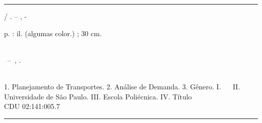 \documentclass[
  12pt,        %
  openright,      %
  twoside,      %
  a4paper,      %
  english,      %
  brazil        %
]{abntex2}
\begin{document}
\begin{fichacatalografica}
  \vspace*{\fill}          %
  \hrule              %
  \begin{center}          %
  \begin{minipage}[c]{12.5cm}    %

  \imprimirautor

  \hspace{0.5cm} \imprimirtitulo  / \imprimirautor. --
  \imprimirlocal, \imprimirdata-

  \hspace{0.5cm} \pageref{LastPage} p. : il. (algumas color.) ; 30 cm.\\

  \hspace{0.5cm} \imprimirorientadorRotulo~\imprimirorientador\\


  \hspace{0.5cm}
  \parbox[t]{\textwidth}{\imprimirtipotrabalho~--~\imprimirinstituicao,
  \imprimirdata.}\\

  \hspace{0.5cm} 
    1. Planejamento de Transportes.
    2. Análise de Demanda.
    3. Gênero.
    I. \imprimirorientadorRotulo~\imprimirorientador~
    II. Universidade de São Paulo.
    III. Escola Poliécnica.
    IV. Título\\

  \hspace{8.75cm} CDU 02:141:005.7\\ %

  \end{minipage}
  \end{center}
  \hrule
\end{fichacatalografica}

\end{document}
